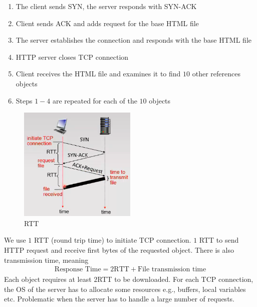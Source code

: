 \documentclass[a4paper]{article}
\theoremstyle{plain}
\theoremstyle{definition}
\newtheorem{exmp}{Example}[section]
\theoremstyle{remark}
\begin{document}
\begin{tcolorbox}[colback=black!3!white,colframe=black!60!white,title=\begin{exmp}Non-Persistent HTTP \label{Non-Persistent HTTP}\end{exmp}]
        \begin{enumerate}
        	\item The client sends SYN, the server responds with SYN-ACK
		\item Client sends ACK and adds request for the base HTML file
		\item The server establishes the connection and responds with the base HTML file
		\item HTTP server closes TCP connection
		\item Client receives the HTML file and examines it to find $10$ other references objects
		\item Steps $1-4$ are repeated for each of the $10$ objects
        \end{enumerate}
	\begin{figure}[H]
		\centering
		\includegraphics[width=0.5\textwidth]{twentysix.png}
		\caption{RTT}
		\label{fig:twentysix-png}
	\end{figure}
	We use $1$ RTT (round trip time) to initiate TCP connection. $1$ RTT to send HTTP request and receive first bytes of the requested object. There is also transmission time, meaning
	\begin{align*}
		\text{Response Time}=2\text{RTT}+\text{File transmission time}
	\end{align*}
	Each object requires at least $2 $RTT to be downloaded. For each TCP connection, the OS of the server has to allocate some resources e.g., buffers, local variables etc. Problematic when the server has to handle a large number of requests.
\end{tcolorbox}
\end{document}
